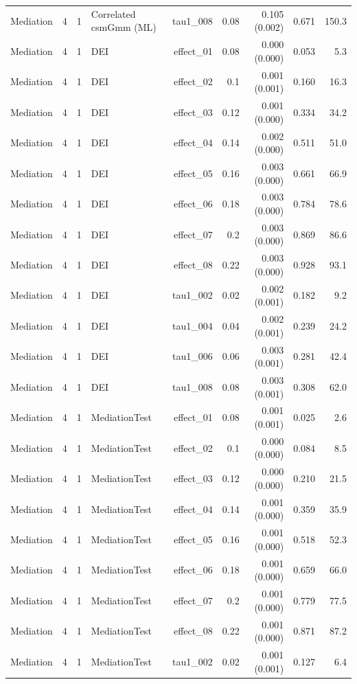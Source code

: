 \begin{longtable}{lcclrrrrr}
Mediation & 4 & 1 & Correlated csmGmm (ML) & tau1\_008 & 0.08 & 0.105 (0.002) & 0.671 & 150.3\\
Mediation & 4 & 1 & DEI & effect\_01 & 0.08 & 0.000 (0.000) & 0.053 & 5.3\\
Mediation & 4 & 1 & DEI & effect\_02 & 0.1 & 0.001 (0.001) & 0.160 & 16.3\\
Mediation & 4 & 1 & DEI & effect\_03 & 0.12 & 0.001 (0.000) & 0.334 & 34.2\\
Mediation & 4 & 1 & DEI & effect\_04 & 0.14 & 0.002 (0.000) & 0.511 & 51.0\\
Mediation & 4 & 1 & DEI & effect\_05 & 0.16 & 0.003 (0.000) & 0.661 & 66.9\\
Mediation & 4 & 1 & DEI & effect\_06 & 0.18 & 0.003 (0.000) & 0.784 & 78.6\\
Mediation & 4 & 1 & DEI & effect\_07 & 0.2 & 0.003 (0.000) & 0.869 & 86.6\\
Mediation & 4 & 1 & DEI & effect\_08 & 0.22 & 0.003 (0.000) & 0.928 & 93.1\\
Mediation & 4 & 1 & DEI & tau1\_002 & 0.02 & 0.002 (0.001) & 0.182 & 9.2\\
Mediation & 4 & 1 & DEI & tau1\_004 & 0.04 & 0.002 (0.001) & 0.239 & 24.2\\
Mediation & 4 & 1 & DEI & tau1\_006 & 0.06 & 0.003 (0.001) & 0.281 & 42.4\\
Mediation & 4 & 1 & DEI & tau1\_008 & 0.08 & 0.003 (0.001) & 0.308 & 62.0\\
Mediation & 4 & 1 & MediationTest & effect\_01 & 0.08 & 0.001 (0.001) & 0.025 & 2.6\\
Mediation & 4 & 1 & MediationTest & effect\_02 & 0.1 & 0.000 (0.000) & 0.084 & 8.5\\
Mediation & 4 & 1 & MediationTest & effect\_03 & 0.12 & 0.000 (0.000) & 0.210 & 21.5\\
Mediation & 4 & 1 & MediationTest & effect\_04 & 0.14 & 0.001 (0.000) & 0.359 & 35.9\\
Mediation & 4 & 1 & MediationTest & effect\_05 & 0.16 & 0.001 (0.000) & 0.518 & 52.3\\
Mediation & 4 & 1 & MediationTest & effect\_06 & 0.18 & 0.001 (0.000) & 0.659 & 66.0\\
Mediation & 4 & 1 & MediationTest & effect\_07 & 0.2 & 0.001 (0.000) & 0.779 & 77.5\\
Mediation & 4 & 1 & MediationTest & effect\_08 & 0.22 & 0.001 (0.000) & 0.871 & 87.2\\
Mediation & 4 & 1 & MediationTest & tau1\_002 & 0.02 & 0.001 (0.001) & 0.127 & 6.4\\

\end{longtable}
